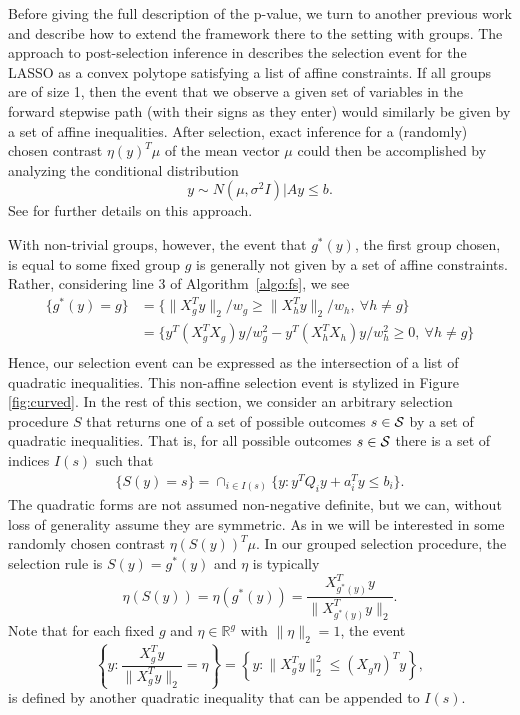 \documentclass{imsart}
\newcommand{\real}{\mathbb{R}}
\begin{document}
Before giving the full description of the p-value, we turn to another
previous work and describe how to extend the framework there to the
setting with groups.
The approach to post-selection inference in \cite{lasso:fixed}
describes the selection event for the LASSO as a convex polytope
satisfying a list of affine constraints.
If all groups are of size 1, then
the event that we observe a given set of variables
in the forward stepwise path (with their signs as they enter) would similarly
be given by a set of affine inequalities.
After selection, exact inference for a (randomly) chosen contrast $\eta(y)^T\mu$ of the mean vector
$\mu$ could then be accomplished by analyzing the conditional distribution
\begin{equation}
y \sim N(\mu, \sigma^2 I) \bigl| Ay \leq b.
\end{equation}
See \cite{lasso:fixed,exact:lars} for further details on this approach.

With non-trivial groups, however, the event that $g^*(y)$, the first
group chosen, is equal to some fixed group $g$ is generally not given by
a set of affine constraints. Rather, considering line 3 of Algorithm~\ref{algo:fs}, we see
\begin{equation}
\label{eq:first:quadratic}
\begin{aligned}
\{g^*(y)=g\} &= \{ \|X_g^Ty\|_2 /w_g \geq \|X_h^Ty\|_2 /w_h , \ \forall h \neq g\} \\
&=  \{ y^T(X_g^TX_g)y / w_g^2 - y^T(X_h^TX_h)y / w_h^2 \geq 0, \ \forall h \neq g\} \\
\end{aligned}
\end{equation}
Hence, our selection event can be expressed as 
the intersection of a list of quadratic inequalities. This non-affine selection event is stylized in Figure
\ref{fig:curved}.
In the rest of this section, we consider an arbitrary selection procedure
$S$ that returns one of a set of possible outcomes $s \in {\cal S}$ by a set of quadratic inequalities.
That is, for all possible outcomes $s \in {\cal S}$ there is a set of indices
$I(s)$ such that
\begin{equation}
\label{eq:selection}
\begin{aligned}
\{S(y)=s\} = \cap_{i \in I(s)} \{y: y^TQ_iy + a_i^Ty\leq b_i \}.
\end{aligned}
\end{equation}
The quadratic forms are not assumed non-negative definite, but we can, without loss of generality
assume they are symmetric.
As in \cite{lasso:fixed} we will be interested in some randomly chosen contrast
$\eta(S(y))^T\mu$.
In our grouped selection procedure, the selection rule is $S(y)=g^*(y)$
and $\eta$ is typically 
$$
\eta(S(y)) = \eta(g^*(y)) = \frac{X_{g^*(y)}^Ty}{\|X_{g^*(y)}^Ty\|_2}.
$$
Note that for each fixed $g$ and $\eta \in \real^g$ with $\|\eta\|_2=1$, the event 
$$
\left\{y:\frac{X_g^Ty}{\|X_g^Ty\|_2} = \eta \right\} = \left\{y: \|X_g^Ty\|^2_2 \leq (X_g\eta)^Ty \right\},
$$
is defined by another quadratic inequality that can be appended to $I(s)$.
\end{document}
